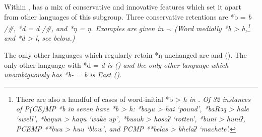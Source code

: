 Within ,  has a mix of conservative
and innovative features which set
it apart from other languages of this subgroup.
Three conservative retentions are *b = \it{b} /{\#\gap},
*d = \it{d} /{\#\gap}, and *ŋ = \it{ŋ}.
Examples are given in --.
(Word medially *b > \it{h},\footnote{
		There are also a handful of cases of word-initial *b > \it{h} in .
		Of 32 instances of P(CE)MP *b in \cite{Edwards2018b} seven have *b > \it{h}:
		*bayu > \it{hai} `pound', *baRəq > \it{hale} `swell', *baŋun > \it{haŋu} `wake up',
		*busuk > \it{hosoʔ} `rotten', *buni > \it{huniʔ}, PCEMP **buu > \it{huu} `blow',
		and PCMP **belas > \it{khelaʔ} `machete'.}
and *d > \it{l}, see below.)

The only other 
languages which regularly retain *ŋ unchanged
are  and  ().
The only other language with *d = \it{d} is  ()
and the only other language which unambiguously
has *b- = \it{b} is  East  ().

